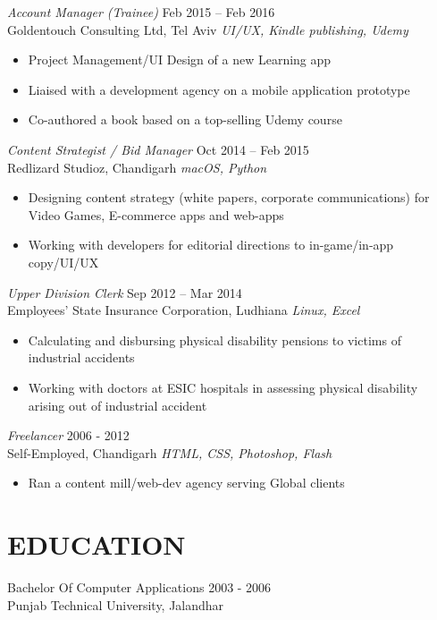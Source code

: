 \documentclass[margin, 10pt]{res} %
\begin{document}
\begin{resume}
{\sl Account Manager (Trainee)} \hfill Feb 2015 – Feb 2016 \\
Goldentouch Consulting Ltd, Tel Aviv \hfill {\scriptsize \it UI/UX, Kindle publishing, Udemy} 
\begin{itemize}
\item Project Management/UI Design of a new Learning app
\item Liaised with a development agency on a mobile application prototype
\item Co-authored a book based on a top-selling Udemy course
\end{itemize}

{\sl Content Strategist / Bid Manager} \hfill Oct 2014 – Feb 2015 \\
Redlizard Studioz, Chandigarh \hfill {\scriptsize \it macOS, Python}
\begin{itemize}
\item Designing content strategy (white papers, corporate communications) for Video Games, E-commerce apps and web-apps
\item Working with developers for editorial directions to in-game/in-app copy/UI/UX
\end{itemize}

{\sl Upper Division Clerk} \hfill Sep 2012 – Mar 2014 \\
Employees' State Insurance Corporation, Ludhiana \hfill {\scriptsize \it Linux, Excel}
\begin{itemize}
\item Calculating and disbursing physical disability pensions to victims of industrial accidents
\item Working with doctors at ESIC hospitals in assessing physical disability arising out of industrial accident 
\end{itemize} 

{\sl Freelancer} \hfill 2006 - 2012 \\
Self-Employed, Chandigarh \hfill {\scriptsize \it HTML, CSS, Photoshop, Flash} 
\begin{itemize}
\item Ran a content mill/web-dev agency serving Global clients
\end{itemize}

\section{EDUCATION}
Bachelor Of Computer Applications \hfill 2003 - 2006 \\
Punjab Technical University, Jalandhar 

\end{resume}
\end{document}
